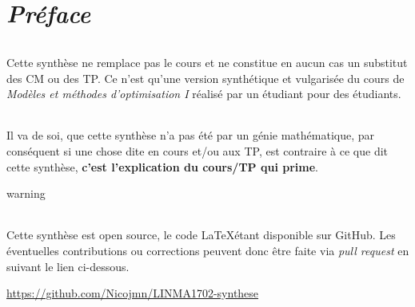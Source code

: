 \chapter*{\textbf{\textit{Préface}}}
    
    \subparagraph{}Cette synthèse ne remplace pas le cours et ne constitue en aucun cas un substitut des CM ou des TP. Ce n'est qu'une version synthétique 
    et vulgarisée du cours de \textit{Modèles et méthodes d'optimisation I} réalisé par un étudiant pour des étudiants.

    \subparagraph{}Il va de soi, que cette synthèse n'a pas été par un génie mathématique, par conséquent si une chose dite en cours et/ou aux TP, est 
    contraire à ce que dit cette synthèse, \textbf{c’est l’explication du cours/TP qui prime}.

    \vfill
    \begin{tbox}{warning}
        \subparagraph{}Cette synthèse est open source, le code \LaTeX\;étant disponible sur GitHub. Les éventuelles contributions ou corrections peuvent
        donc être faite via \textit{pull request} en suivant le lien ci-dessous.
        \tcblower
        \begin{center}
            \href{https://github.com/Nicojmn/LINMA1702-synthese}
            {https://github.com/Nicojmn/LINMA1702-synthese}
        \end{center}
    \end{tbox}
    \vfill